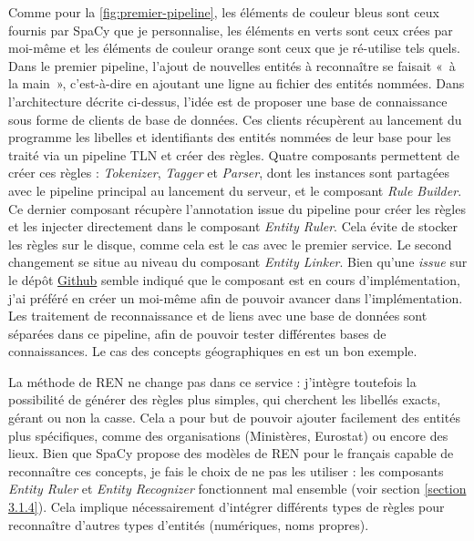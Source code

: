 Comme pour la \autoref{fig:premier-pipeline}, les éléments de couleur bleus sont ceux fournis par SpaCy que je personnalise, les éléments en verts sont ceux crées par moi-même et les éléments de couleur orange sont ceux que je ré-utilise tels quels. Dans le premier pipeline, l'ajout de nouvelles entités à reconnaître se faisait «~à la main~», c'est-à-dire en ajoutant une ligne au fichier des entités nommées. Dans l'architecture décrite ci-dessus, l'idée est de proposer une base de connaissance sous forme de clients de base de données. Ces clients récupèrent au lancement du programme les libelles et identifiants des entités nommées de leur base pour les traité via un pipeline TLN et créer des règles. Quatre composants permettent de créer ces règles : \textit{Tokenizer}, \textit{Tagger} et \textit{Parser}, dont les instances sont partagées avec le pipeline principal au lancement du serveur, et le composant \textit{Rule Builder}. Ce dernier composant récupère l'annotation issue du pipeline pour créer les règles et les injecter directement dans le composant \textit{Entity Ruler}. Cela évite de stocker les règles sur le disque, comme cela est le cas avec le premier service.
Le second changement se situe au niveau du composant \textit{Entity Linker}. Bien qu'une \textit{issue} sur le dépôt \href{https://github.com/explosion/spaCy/issues}{Github} semble indiqué que le composant est en cours d'implémentation, j'ai préféré en créer un moi-même afin de pouvoir avancer dans l'implémentation. Les traitement de reconnaissance et de liens avec une base de données sont séparées dans ce pipeline, afin de pouvoir tester différentes bases de connaissances. Le cas des concepts géographiques en est un bon exemple.
\newline

La méthode de REN ne change pas dans ce service : j'intègre toutefois la possibilité de générer des règles plus simples, qui cherchent les libellés exacts, gérant ou non la casse. Cela a pour but de pouvoir ajouter facilement des entités plus spécifiques, comme des organisations (Ministères, Eurostat) ou encore des lieux. Bien que SpaCy propose des modèles de REN pour le français capable de reconnaître ces concepts, je fais le choix de ne pas les utiliser : les composants \textit{Entity Ruler} et \textit{Entity Recognizer} fonctionnent mal ensemble (voir section \ref{section 3.1.4}). Cela implique nécessairement d'intégrer différents types de règles pour reconnaître d'autres types d'entités (numériques, noms propres). 
\newline

